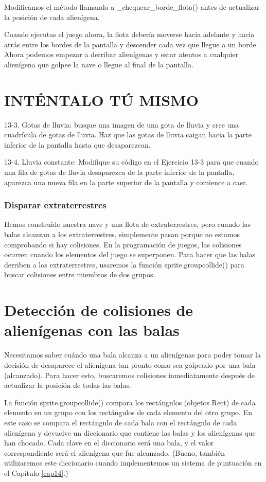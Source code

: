 Modificamos el método llamando a {\ttfamily  \_chequear\_borde\_flota()} antes de actualizar la posición de cada alienígena.


Cuando ejecutas el juego ahora, la flota debería moverse hacia adelante y hacia atrás entre los bordes de la pantalla y descender cada vez que llegue a un borde. Ahora podemos empezar a derribar alienígenas y estar atentos a cualquier alienígena que golpee la nave o llegue al final de la pantalla.

\section{INTÉNTALO TÚ MISMO}

13-3. Gotas de lluvia: busque una imagen de una gota de lluvia y cree una cuadrícula de gotas de lluvia. Haz que las gotas de lluvia caigan hacia la parte inferior de la pantalla hasta que desaparezcan.

13-4. Lluvia constante: Modifique su código en el Ejercicio 13-3 para que cuando una fila de gotas de lluvia desaparezca de la parte inferior de la pantalla, aparezca una nueva fila en la parte superior de la pantalla y comience a caer.


\subsubsection{Disparar extraterrestres}


Hemos construido nuestra nave y una flota de extraterrestres, pero cuando las balas alcanzan a los extraterrestres, simplemente pasan porque no estamos comprobando si hay colisiones. En la programación de juegos, las colisiones ocurren cuando los elementos del juego se superponen. Para hacer que las balas derriben a los extraterrestres, usaremos la función {\ttfamily sprite.groupcollide()} para buscar colisiones entre miembros de dos grupos.

\section{Detección de colisiones de alienígenas con las balas}

Necesitamos saber cuándo una bala alcanza a un alienígenas para poder tomar la decisión de desaparece el  alienígena tan 
pronto como sea golpeado por una bala (alcanzado). Para hacer esto, buscaremos colisiones inmediatamente después de actualizar 
la posición de todas las balas.

La función  {\ttfamily sprite.groupcollide()} compara los rectángulos ({\ttfamily objetos Rect}) de cada elemento en un grupo con los rectángulos de cada elemento del otro grupo. 
En este caso se compara el rectángulo de cada bala con el rectángulo de cada alienígena y devuelve un diccionario que contiene
las balas y los alienígenas que han chocado. Cada clave en el diccionario será una bala, y el valor correspondiente será el alienígena que fue alcanzado. (Bueno, también utilizaremos este diccionario cuando implementemos un sistema de puntuación en el Capítulo \ref{cap14}.)


